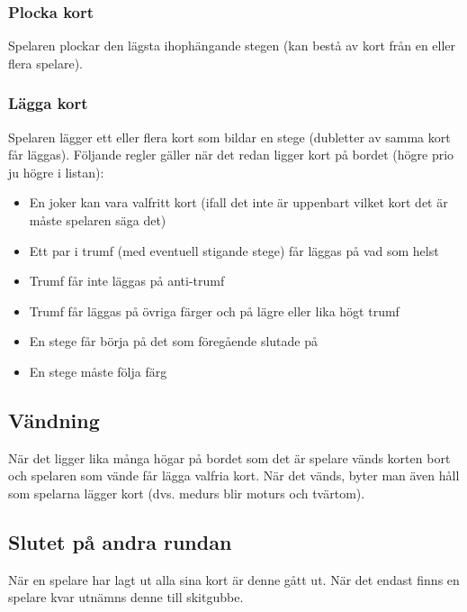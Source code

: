 \documentclass[a4paper,12pt]{article}
\begin{document}
\subsubsection{Plocka kort}
Spelaren plockar den lägsta ihophängande stegen (kan bestå av kort från en eller flera spelare).

\subsubsection{Lägga kort}
Spelaren lägger ett eller flera kort som bildar en stege (dubletter av samma kort får läggas). Följande regler gäller när det redan ligger kort på bordet (högre prio ju högre i listan):
\begin{itemize}
  \item En joker kan vara valfritt kort (ifall det inte är uppenbart vilket kort det är måste spelaren säga det)
  \item Ett par i trumf (med eventuell stigande stege) får läggas på vad som helst
  \item Trumf får inte läggas på anti-trumf
  \item Trumf får läggas på övriga färger och på lägre eller lika högt trumf
  \item En stege får börja på det som föregående slutade på
  \item En stege måste följa färg
\end{itemize}

\subsection{Vändning}
När det ligger lika många högar på bordet som det är spelare vänds korten bort och spelaren som vände får lägga valfria kort. När det vänds, byter man även håll som spelarna lägger kort (dvs. medurs blir moturs och tvärtom).

\subsection{Slutet på andra rundan}
När en spelare har lagt ut alla sina kort är denne gått ut. När det endast finns en spelare kvar utnämns denne till skitgubbe.
\end{document}
